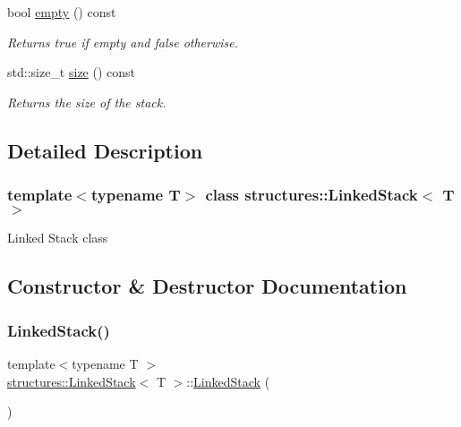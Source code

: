 \begin{DoxyCompactItemize}
bool \mbox{\hyperlink{classstructures_1_1_linked_stack_ac9704fd697f9c4ed4f7fc4e786114e4f}{empty}} () const
\begin{DoxyCompactList}\small\item\em Returns true if empty and false otherwise. \end{DoxyCompactList}\item 
std\+::size\+\_\+t \mbox{\hyperlink{classstructures_1_1_linked_stack_ae1ca6a5a9b837471863f1c8bb23cfe1d}{size}} () const
\begin{DoxyCompactList}\small\item\em Returns the size of the stack. \end{DoxyCompactList}\end{DoxyCompactItemize}


\subsection{Detailed Description}
\subsubsection*{template$<$typename T$>$\newline
class structures\+::\+Linked\+Stack$<$ T $>$}

Linked Stack class 

\subsection{Constructor \& Destructor Documentation}
\mbox{\label{classstructures_1_1_linked_stack_a546b827cccaa49b4f470110bc3a9004e}} 
\subsubsection{\texorpdfstring{Linked\+Stack()}{LinkedStack()}}
{\footnotesize\ttfamily template$<$typename T $>$ \\
\mbox{\hyperlink{classstructures_1_1_linked_stack}{structures\+::\+Linked\+Stack}}$<$ T $>$\+::\mbox{\hyperlink{classstructures_1_1_linked_stack}{Linked\+Stack}} (\begin{DoxyParamCaption}{ }\end{DoxyParamCaption})}



